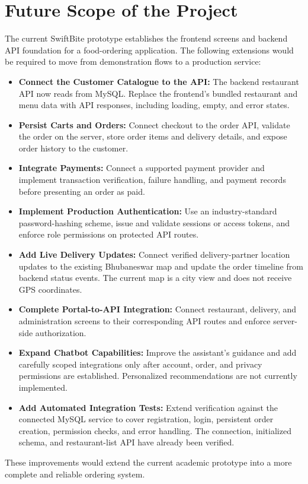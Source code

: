 \chapter{Future Scope of the Project}

The current SwiftBite prototype establishes the frontend screens and backend API foundation for a food-ordering application. The following extensions would be required to move from demonstration flows to a production service:

\begin{itemize}

\item \textbf{Connect the Customer Catalogue to the API:}
The backend restaurant API now reads from MySQL. Replace the frontend's bundled restaurant and menu data with API responses, including loading, empty, and error states.

\item \textbf{Persist Carts and Orders:}
Connect checkout to the order API, validate the order on the server, store order items and delivery details, and expose order history to the customer.

\item \textbf{Integrate Payments:}
Connect a supported payment provider and implement transaction verification, failure handling, and payment records before presenting an order as paid.

\item \textbf{Implement Production Authentication:}
Use an industry-standard password-hashing scheme, issue and validate sessions or access tokens, and enforce role permissions on protected API routes.

\item \textbf{Add Live Delivery Updates:}
Connect verified delivery-partner location updates to the existing Bhubaneswar map and update the order timeline from backend status events. The current map is a city view and does not receive GPS coordinates.

\item \textbf{Complete Portal-to-API Integration:}
Connect restaurant, delivery, and administration screens to their corresponding API routes and enforce server-side authorization.

\item \textbf{Expand Chatbot Capabilities:}
Improve the assistant's guidance and add carefully scoped integrations only after account, order, and privacy permissions are established. Personalized recommendations are not currently implemented.

\item \textbf{Add Automated Integration Tests:}
Extend verification against the connected MySQL service to cover registration, login, persistent order creation, permission checks, and error handling. The connection, initialized schema, and restaurant-list API have already been verified.

\end{itemize}

These improvements would extend the current academic prototype into a more complete and reliable ordering system.
